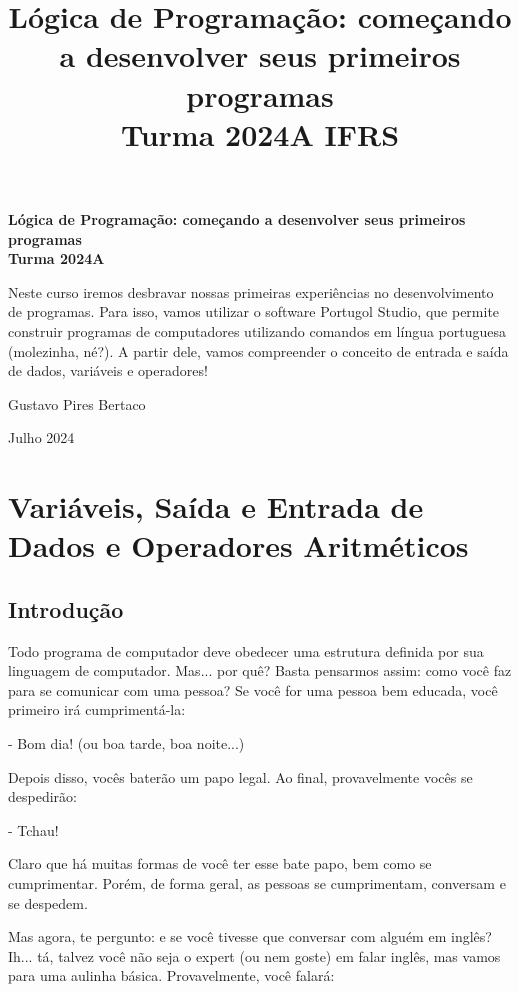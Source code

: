 \documentclass{article}
\title{\textbf{Lógica de Programação: começando a desenvolver seus primeiros programas} \\ Turma 2024A IFRS}
\author{}
\date{}
\begin{document}
\begin{titlepage}
    \centering
    \vspace*{4cm}
    {\huge\bfseries Lógica de Programação: começando a desenvolver seus primeiros programas\\ Turma 2024A\par}
    \vspace{2cm}
    \begin{tcolorbox}[colback=blue!5!white, colframe=blue!75!black, title=Descrição do Curso]
        \small Neste curso iremos desbravar nossas primeiras experiências no desenvolvimento de programas. Para isso, vamos utilizar o software Portugol Studio, que permite construir programas de computadores utilizando comandos em língua portuguesa (molezinha, né?). A partir dele, vamos compreender o conceito de entrada e saída de dados, variáveis e operadores!
    \end{tcolorbox}
    \vfill
    {\Large Gustavo Pires Bertaco\par}
    {\large Julho 2024\par}
\end{titlepage}

\newpage

\renewcommand{\contentsname}{Sumário}
\tableofcontents

\newpage

\section{Variáveis, Saída e Entrada de Dados e Operadores Aritméticos}
\subsection{Introdução}
Todo programa de computador deve obedecer uma estrutura definida por sua linguagem de computador. Mas... por quê? Basta pensarmos assim: como você faz para se comunicar com uma pessoa? Se você for uma pessoa bem educada, você primeiro irá cumprimentá-la:

- Bom dia! (ou boa tarde, boa noite...)

Depois disso, vocês baterão um papo legal. Ao final, provavelmente vocês se despedirão:

- Tchau!

Claro que há muitas formas de você ter esse bate papo, bem como se cumprimentar. Porém, de forma geral, as pessoas se cumprimentam, conversam e se despedem.

Mas agora, te pergunto: e se você tivesse que conversar com alguém em inglês? Ih... tá, talvez você não seja o expert (ou nem goste) em falar inglês, mas vamos para uma aulinha básica. Provavelmente, você falará:
\end{document}
